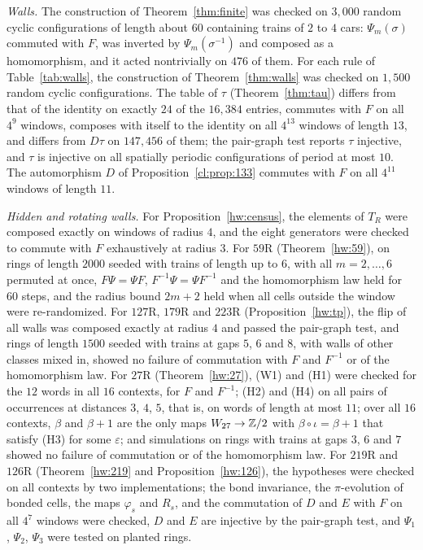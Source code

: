 \emph{Walls.} The construction of Theorem~\ref{thm:finite} was checked on $3{,}000$ random cyclic configurations of length about $60$ containing trains of $2$ to $4$ cars: $\Psi_m(\sigma)$ commuted with $F$, was inverted by $\Psi_m(\sigma^{-1})$ and composed as a homomorphism, and it acted nontrivially on $476$ of them. For each rule of Table~\ref{tab:walls}, the construction of Theorem~\ref{thm:walls} was checked on $1{,}500$ random cyclic configurations. The table of $\tau$ (Theorem~\ref{thm:tau}) differs from that of the identity on exactly $24$ of the $16{,}384$ entries, commutes with $F$ on all $4^9$ windows, composes with itself to the identity on all $4^{13}$ windows of length $13$, and differs from $D\tau$ on $147{,}456$ of them; the pair-graph test reports $\tau$ injective, and $\tau$ is injective on all spatially periodic configurations of period at most $10$. The automorphism $D$ of Proposition~\ref{cl:prop:133} commutes with $F$ on all $4^{11}$ windows of length $11$.

\emph{Hidden and rotating walls.} For Proposition~\ref{hw:census}, the elements of $T_R$ were composed exactly on windows of radius $4$, and the eight generators were checked to commute with $F$ exhaustively at radius $3$. For $59$R (Theorem~\ref{hw:59}), on rings of length $2000$ seeded with trains of length up to $6$, with all $m=2,\dots,6$ permuted at once, $F\Psi=\Psi F$, $F^{-1}\Psi=\Psi F^{-1}$ and the homomorphism law held for $60$ steps, and the radius bound $2m+2$ held when all cells outside the window were re-randomized. For $127$R, $179$R and $223$R (Proposition~\ref{hw:tp}), the flip of all walls was composed exactly at radius $4$ and passed the pair-graph test, and rings of length $1500$ seeded with trains at gaps $5$, $6$ and $8$, with walls of other classes mixed in, showed no failure of commutation with $F$ and $F^{-1}$ or of the homomorphism law. For $27$R (Theorem~\ref{hw:27}), (W1) and (H1) were checked for the $12$ words in all $16$ contexts, for $F$ and $F^{-1}$; (H2) and (H4) on all pairs of occurrences at distances $3$, $4$, $5$, that is, on words of length at most $11$; over all $16$ contexts, $\beta$ and $\beta+1$ are the only maps $W_{27}\to\mathbb{Z}/2$ with $\beta\circ\iota=\beta+1$ that satisfy (H3) for some $\varepsilon$; and simulations on rings with trains at gaps $3$, $6$ and $7$ showed no failure of commutation or of the homomorphism law. For $219$R and $126$R (Theorem~\ref{hw:219} and Proposition~\ref{hw:126}), the hypotheses were checked on all contexts by two implementations; the bond invariance, the $\pi$-evolution of bonded cells, the maps $\varphi_s$ and $R_s$, and the commutation of $D$ and $E$ with $F$ on all $4^7$ windows were checked, $D$ and $E$ are injective by the pair-graph test, and $\Psi_1$, $\Psi_2$, $\Psi_3$ were tested on planted rings.

